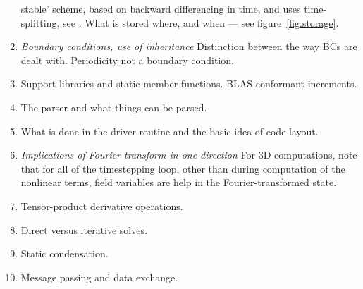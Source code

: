 \documentclass[11pt]{report}
\begin{document}
\begin{enumerate}
stable' scheme, based on backward differencing in time, and uses
time-splitting, see \citet{kio91}. What is stored where, and when ---
see figure~\ref{fig.storage}.
\item
\textsl{Boundary conditions, use of inheritance} Distinction between
the way BCs are dealt with. Periodicity not a boundary condition.
\item
Support libraries and static member functions. BLAS-conformant increments.
\item
The parser and what things can be parsed.
\item
What is done in the driver routine and the basic idea of code layout.
\item
\textsl{Implications of Fourier transform in one direction} For 3D
computations, note that for all of the timestepping loop, other than
during computation of the nonlinear terms, field variables are help in
the Fourier-transformed state.
\item
Tensor-product derivative operations.
\item
Direct versus iterative solves.
\item
Static condensation.
\item
Message passing and data exchange.
\end{enumerate}
\end{document}
